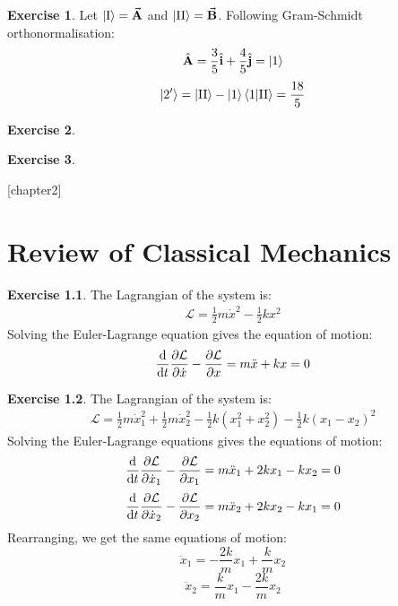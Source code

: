 \documentclass{report}
\theoremstyle{definition}
\newtheorem{chapter1}{Exercise}
\newcounter{subpart1}[chapter1]
\begin{document}
\begin{chapter1}\label{prob:5}
	Let $\ket {\mathrm{I}} = \va{A}$ and $\ket{\mathrm{II}} = \va B$. Following Gram-Schmidt orthonormalisation:
		\begin{gather*}
			\hat {\bf A} = \frac{3}{5}{\hat {\bf i}} + \frac{4}{5}{\hat {\bf j}} = \ket 1
		\end{gather*}
		\begin{gather*}
			\ket {2'} = \ket{\mathrm{II}} - \ket 1 \braket{1}{\mathrm{II}} = \frac{18}{5} 
		\end{gather*}
\end{chapter1}

\begin{chapter1}\label{prob:6}
	
\end{chapter1}

\begin{chapter1}\label{prob:7}
	
\end{chapter1}

\newtheorem{chapter2}{Exercise}
[chapter2]

\chapter{Review of Classical Mechanics}

\begin{chapter2}\label{prob: 1}
	The Lagrangian of the system is:
		\begin{gather*}
			\mathcal{L} = \frac{1}{2}m{\dot x}^2 - \frac{1}{2}kx^2
		\end{gather*}
		Solving the Euler-Lagrange equation gives the equation of motion:
		\begin{gather*}
			\dv{t}\pdv{\mathcal{L}}{\dot x} - \pdv{\mathcal{L}}{x}
			= m\ddot x + kx = 0
		\end{gather*}
\end{chapter2}

\begin{chapter2}\label{prob: 2}
	The Lagrangian of the system is:
		\begin{gather*}
			\mathcal{L} = \frac{1}{2}m{\dot x}^2_1 + \frac{1}{2}m{\dot x}^2_2 - \frac{1}{2}k(x^2_1 + x^2_2) - \frac{1}{2}k(x_1 - x_2)^2
		\end{gather*}
		Solving the Euler-Lagrange equations gives the equations of motion:
		\begin{gather*}
			\dv{t} \pdv{\mathcal{L}}{\dot x_1} - \pdv{\mathcal{L}}{x_1}
			= m{\ddot x_1} + 2kx_1 - kx_2 =0 
		\end{gather*}
		\begin{gather*}
			\dv{t} \pdv{\mathcal{L}}{\dot x_2} - \pdv{\mathcal{L}}{x_2}
			= m{\ddot x_2} + 2kx_2 - kx_1 =0 
		\end{gather*}
		Rearranging, we get the same equations of motion:
		$$ \ddot x_1 = -\frac{2k}{m}x_1 + \frac{k}{m}x_2 $$
		$$ \ddot x_2 = \frac{k}{m}x_1 - \frac{2k}{m}x_2 $$
\end{chapter2}
\end{document}
